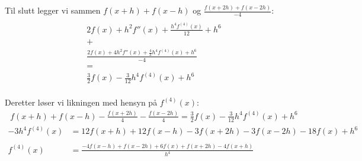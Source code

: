 Til slutt legger vi sammen $f(x+h)+f(x-h)$ og $\frac{f(x+2h)+f(x-2h)}{-4}$: 
\begin{multline}
	\\
	2f(x)+h^2f''(x)+\frac{h^4f^{(4)}(x)}{12} + h^6 \\
	+\\
	\frac{2f(x)+4h^2f''(x)+\frac{4}{3}h^4f^{(4)}(x)+h^6 }{-4}\\
	=\\
	\frac{3}{2}f(x)-\frac{3}{12}h^4f^{(4)}(x)+h^6\\
\end{multline}

Deretter løser vi likningen med hensyn på $f^{(4)}(x)$: 
\begin{align}
    f(x+h)+f(x-h)-\frac{f(x+2h)}{4}-\frac{f(x-2h)}{4}=\frac{3}{2}f(x)-\frac{3}{12}h^4f^{(4)}(x)+h^6\nonumber
\end{align}
\begin{align}
     -3h^4f^{(4)}(x)&=12f(x+h)+12f(x-h)-3f(x+2h)-3f(x-2h)-18f(x) +h^6 \nonumber \\
     \nonumber \\
	f^{(4)}(x)&=\frac{-4f(x-h)+f(x-2h)+6f(x)+f(x+2h)-4f(x+h)}{h^4}
\end{align}
 







